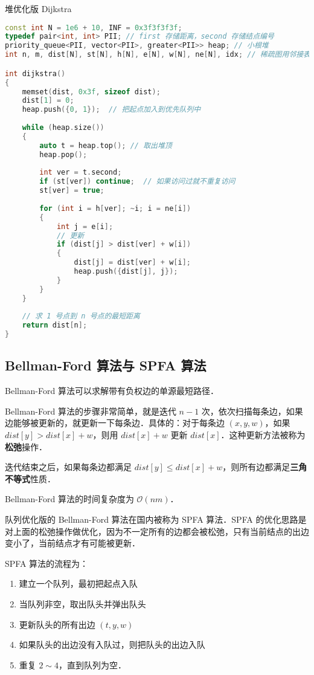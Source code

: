 堆优化版 Dijkstra

\begin{lstlisting}[language=cpp]
const int N = 1e6 + 10, INF = 0x3f3f3f3f;
typedef pair<int, int> PII; // first 存储距离，second 存储结点编号
priority_queue<PII, vector<PII>, greater<PII>> heap; // 小根堆
int n, m, dist[N], st[N], h[N], e[N], w[N], ne[N], idx; // 稀疏图用邻接表存图

int dijkstra()
{
    memset(dist, 0x3f, sizeof dist);
    dist[1] = 0;
    heap.push({0, 1});  // 把起点加入到优先队列中
    
    while (heap.size())
    {
        auto t = heap.top(); // 取出堆顶
        heap.pop();
        
        int ver = t.second;
        if (st[ver]) continue;  // 如果访问过就不重复访问
        st[ver] = true;
        
        for (int i = h[ver]; ~i; i = ne[i])
        {
            int j = e[i];
            // 更新
            if (dist[j] > dist[ver] + w[i])
            {
                dist[j] = dist[ver] + w[i];
                heap.push({dist[j], j});
            }
        }
    }
    
    // 求 1 号点到 n 号点的最短距离
    return dist[n];
}
\end{lstlisting}

\subsection{Bellman-Ford 算法与 SPFA 算法}

Bellman-Ford 算法可以求解带有负权边的单源最短路径．

Bellman-Ford 算法的步骤非常简单，就是迭代 $n - 1$ 次，依次扫描每条边，如果边能够被更新的，就更新一下每条边．具体的：对于每条边 $(x, y, w)$，如果 $dist[y] > dist[x] + w$，则用 $dist[x] + w$ 更新 $dist[x]$．这种更新方法被称为\textbf{松弛}操作．

迭代结束之后，如果每条边都满足 $dist[y] \leq dist[x] + w$，则所有边都满足\textbf{三角不等式}性质．

Bellman-Ford 算法的时间复杂度为 $\mathcal{O}(nm)$．

队列优化版的 Bellman-Ford 算法在国内被称为 SPFA 算法．SPFA 的优化思路是对上面的松弛操作做优化，因为不一定所有的边都会被松弛，只有当前结点的出边变小了，当前结点才有可能被更新．

SPFA 算法的流程为：

\begin{enumerate}
\item 建立一个队列，最初把起点入队
\item 当队列非空，取出队头并弹出队头
\item 更新队头的所有出边 $(t, y, w)$
\item 如果队头的出边没有入队过，则把队头的出边入队
\item 重复 $2 \sim 4$，直到队列为空．
\end{enumerate}

